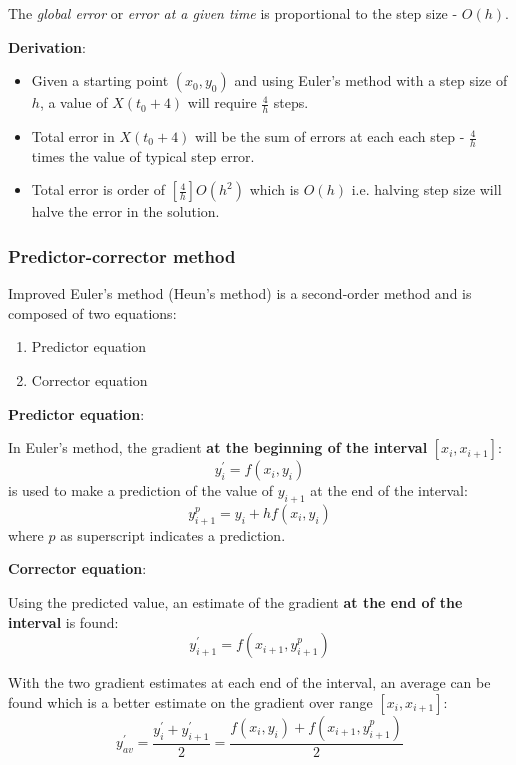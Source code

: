 \documentclass[10pt,a4paper]{article}
\begin{document}
The \textit{global error} or \textit{error at a given time} is proportional to the step size -
$O(h)$. 

\textbf{Derivation}:
\begin{itemize}
    \item Given a starting point $(x_0, y_0)$ and using Euler's method with a step size of $h$, a
    value of $X(t_0 + 4)$ will require $\frac{4}{h}$ steps. 
    \item Total error in $X(t_0 + 4)$ will be the sum of errors at each each step - $\frac{4}{h}$
    times the value of typical step error.
    \item Total error is order of $\left[\frac{4}{h}\right]O(h^2)$ which is $O(h)$ i.e. halving step
    size will halve the error in the solution.
\end{itemize}

\subsubsection{Predictor-corrector method}

Improved Euler's method (Heun's method) is a second-order method and is composed of two equations:
\begin{enumerate}
    \item Predictor equation
    \item Corrector equation
\end{enumerate}

\textbf{Predictor equation}:

In Euler's method, the gradient \textbf{at the beginning of the interval} $[x_i, x_{i+1}]$:
$$
    y_i^{\prime}=f(x_i,y_i)
$$
is used to make a prediction of the value of $y_{i+1}$ at the end of the interval: 
$$
    y_{i+1}^p = y_i + hf(x_i,y_i)
$$
where $p$ as superscript indicates a prediction. \par 

\textbf{Corrector equation}:

Using the predicted value, an estimate of the gradient \textbf{at the end of the interval} is found:
$$
    y_{i+1}^{\prime} = f(x_{i+1},y_{i+1}^p)
$$

With the two gradient estimates at each end of the interval, an average can be found which is a
better estimate on the gradient over range $[x_i, x_{i+1}]$:
$$
    y_{av}^{\prime} = \frac{y_i^\prime + y_{i+1}^{\prime}}{2} = \frac{f(x_i,y_i)+f(x_{i+1},y_{i+1}^p)}{2}
$$
\end{document}
